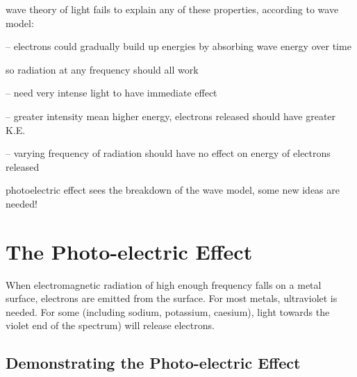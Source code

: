 \cmt wave theory of light fails to explain any of these properties, according to wave model:

\begin{compactitem}
	
	\item[--] electrons could gradually build up energies by absorbing wave energy over time
	
	so radiation at any frequency should all work 
	
	
	\item[--] need very intense light to have immediate effect
	
	\item[--] greater intensity mean higher energy, electrons released should have greater K.E.
	
	\item[--] varying frequency of radiation should have no effect on energy of electrons released
\end{compactitem}

photoelectric effect sees the breakdown of the wave model, some new ideas are needed!

\newpage
\section{The Photo-electric Effect}
When electromagnetic radiation of high enough frequency falls on a metal surface, electrons are emitted from the surface.
For most metals, ultraviolet is needed. For some (including sodium, potassium, caesium), light towards the violet end of the spectrum) will release electrons.

 
\subsection{Demonstrating the Photo-electric Effect}

